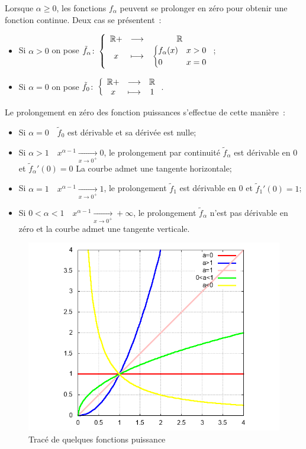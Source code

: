 Lorsque $\alpha \geq 0$, les fonctions $f_\alpha$ peuvent se prolonger en zéro pour obtenir une fonction continue. Deux cas se présentent~:
\begin{itemize}
\item Si $\alpha>0$ on pose $\tilde{f}_\alpha\colon \left\{\begin{array}{ccc} \mathbb{R}+ & \longrightarrow &\mathbb{R}\\ x & \longmapsto & \begin{cases} f_\alpha(x) & x>0 \\ 0 & x=0 \end{cases} \end{array} \right.$;
\item Si $\alpha=0$ on pose $\tilde{f}_0\colon \left\{\begin{array}{ccc} \mathbb{R}+ & \longrightarrow &\mathbb{R}\\ x & \longmapsto & 1 \end{array} \right.$.
\end{itemize}
Le prolongement en zéro des fonction puissances s'effectue de cette manière~:
\begin{itemize}
\item Si $\alpha=0 \quad \tilde{f}_0$ est dérivable et sa dérivée est nulle;
\item Si $\alpha>1 \quad x^{\alpha-1}\underset{x \to 0^+}{\longrightarrow}0$, le prolongement par continuité $\tilde{f}_\alpha$ est dérivable en 0 et $\tilde{f}_\alpha'(0)=0$ La courbe admet une tangente horizontale;
\item Si $\alpha=1 \quad x^{\alpha-1}\underset{x \to 0^+}{\longrightarrow}1$, le prolongement  $\tilde{f}_1$ est dérivable en 0 et $\tilde{f}_1'(0)=1$;
\item Si $0<\alpha<1 \quad x^{\alpha-1}\underset{x \to 0^+}{\longrightarrow}+\infty $, le prolongement $\tilde{f}_\alpha$ n'est pas dérivable en zéro et la courbe admet une tangente verticale.
\end{itemize}
%
\begin{figure}
  \centering
  \includegraphics[scale=0.4,angle=-90]{puiss.png}
  \caption{Tracé de quelques fonctions puissance}
  \label{figtracepuissance}
\end{figure}

